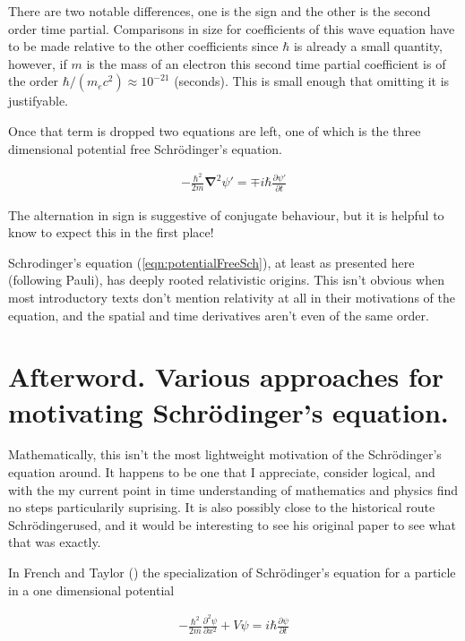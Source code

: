 \documentclass[]{eliblog}
\newcommand{\spacegrad}[0]{\boldsymbol{\nabla}}
\newcommand{\Schrodinger}[0]{Schr\"{o}dinger}
\begin{document}
There are two notable differences, one is the sign and the other is the second order time partial.  
Comparisons in size for coefficients of this wave equation have to be made relative to the other coefficients since $\hbar$ is already a small quantity,
however, if $m$ is the mass of an electron this second time partial coefficient is of the order $\hbar/(m_e c^2) \approx 10^{-21}$ (seconds).  This is
small enough that omitting it is justifyable.

Once that term is dropped two equations are left, one of which is the three dimensional potential free \Schrodinger's equation.

\begin{align}\label{eqn:potentialFreeSch}
-\frac{\hbar^2}{2m} \spacegrad^2 \psi' = \mp i \hbar \frac{\partial \psi'}{\partial t}
\end{align}

The alternation in sign is suggestive of conjugate behaviour, but it is helpful to know to expect this in the first place!

Schrodinger's equation (\ref{eqn:potentialFreeSch}), at least as presented here (following Pauli), has deeply rooted relativistic origins.
This isn't obvious when most introductory texts don't mention relativity at all in their motivations of the equation, and
the spatial and time derivatives aren't even of the same order.

\section{Afterword.  Various approaches for motivating \Schrodinger's equation.}

Mathematically, this isn't the most lightweight motivation of the \Schrodinger's equation around.  It happens to be one that I appreciate, consider
logical, and with the my current point in time understanding of mathematics and physics find no steps particularily suprising.
It is also possibly close to the historical route \Schrodinger used, and it would be interesting to see his original paper to see what that was exactly.

In French and Taylor (\cite{french1998iqp}) the specialization of \Schrodinger's equation for a particle in a one dimensional potential

\begin{align}\label{eqn:oneDimSch}
-\frac{\hbar^2}{2m} \frac{\partial^2 \psi}{\partial x^2} + V\psi = i \hbar \frac{\partial \psi}{\partial t}
\end{align}
\end{document}

